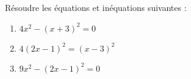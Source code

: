 
\begin{exercice}\label{exosmath-0666}

    Résoudre les équations et inéquations suivantes :
        \begin{enumerate}
            \item
        $4x^2-(x+3)^2=0$
    \item
        \( 4(2x-1)^2=(x-3)^2\)
    \item
        \( 9x^2-(2x-1)^2=0\)
        \end{enumerate}

\end{exercice}
